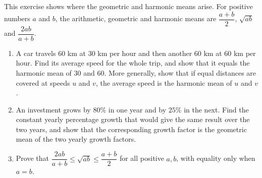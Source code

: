 This exercise shows where the geometric and harmonic means arise. For positive numbers $a$ and $b$, the arithmetic, geometric and harmonic means are $\dfrac{a+b}{2}$, $\sqrt{ab}$ and $\dfrac{2ab}{a+b}$.
\begin{enumerate}
\item[(a)] A car travels $60$ km at $30$ km per hour and then another $60$ km at $60$ km per hour. Find its average speed for the whole trip, and show that it equals the harmonic mean of $30$ and $60$. More generally, show that if equal distances are covered at speeds $u$ and $v$, the average speed is the harmonic mean of $u$ and $v$.
\item[(b)] An investment grows by $80\%$ in one year and by $25\%$ in the next. Find the constant yearly percentage growth that would give the same result over the two years, and show that the corresponding growth factor is the geometric mean of the two yearly growth factors.
\item[(c)] Prove that $\dfrac{2ab}{a+b}\le\sqrt{ab}\le\dfrac{a+b}{2}$ for all positive $a,b$, with equality only when $a=b$.
\end{enumerate}
